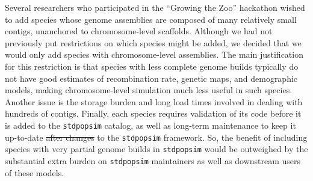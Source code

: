 \documentclass[hidelinks]{article}
\newcommand{\stdpopsim}{\texttt{stdpopsim}\xspace}
\providecommand{\DIFaddtex}[1]{{\protect\color{blue}\uwave{#1}}} %
\providecommand{\DIFdeltex}[1]{{\protect\color{red}\sout{#1}}}                      %
\providecommand{\DIFaddbegin}{} %
\providecommand{\DIFaddend}{} %
\providecommand{\DIFdelbegin}{} %
\providecommand{\DIFdelend}{} %
\providecommand{\DIFadd}[1]{\texorpdfstring{\DIFaddtex{#1}}{#1}} %
\providecommand{\DIFdel}[1]{\texorpdfstring{\DIFdeltex{#1}}{}} %
\newcommand{\DIFscaledelfig}{0.5}
\newlength{\DIFdelgraphicswidth} %
\newlength{\DIFdelgraphicsheight} %
\newcommand{\DIFaddincludegraphics}[2][]{{\color{blue}\fbox{\DIFOincludegraphics[#1]{#2}}}} %
\newcommand{\DIFdelincludegraphics}[2][]{%
\sbox{\DIFdelgraphicsbox}{\DIFOincludegraphics[#1]{#2}}%
\settoboxwidth{\DIFdelgraphicswidth}{\DIFdelgraphicsbox} %
\settoboxtotalheight{\DIFdelgraphicsheight}{\DIFdelgraphicsbox} %
\scalebox{\DIFscaledelfig}{%
\parbox[b]{\DIFdelgraphicswidth}{\usebox{\DIFdelgraphicsbox}\\[-\baselineskip] \rule{\DIFdelgraphicswidth}{0em}}\llap{\resizebox{\DIFdelgraphicswidth}{\DIFdelgraphicsheight}{%
\setlength{\unitlength}{\DIFdelgraphicswidth}%
\begin{picture}(1,1)%
\thicklines\linethickness{2pt} %
{\color[rgb]{1,0,0}\put(0,0){\framebox(1,1){}}}%
{\color[rgb]{1,0,0}\put(0,0){\line( 1,1){1}}}%
{\color[rgb]{1,0,0}\put(0,1){\line(1,-1){1}}}%
\end{picture}%
}\hspace*{3pt}}} %
} %
\DeclareRobustCommand{\DIFaddbegin}{\DIFOaddbegin \let\includegraphics\DIFaddincludegraphics} %
\DeclareRobustCommand{\DIFaddend}{\DIFOaddend \let\includegraphics\DIFOincludegraphics} %
\DeclareRobustCommand{\DIFdelbegin}{\DIFOdelbegin \let\includegraphics\DIFdelincludegraphics} %
\DeclareRobustCommand{\DIFdelend}{\DIFOaddend \let\includegraphics\DIFOincludegraphics} %
\begin{document}
Several researchers who participated in the ``Growing the Zoo'' hackathon wished to add species
whose genome assemblies are composed of many relatively small contigs,
unanchored to chromosome-level scaffolds.
Although we had not previously put restrictions on which species might be added,
we decided that we would only add species with chromosome-level assemblies.
%
The main justification for this restriction is that
species with less complete genome builds typically do not have good estimates of recombination rate, genetic maps, and demographic models,
making chromosome-level simulation much less useful in such species.
%
Another issue is the storage burden and long load times involved in dealing with
hundreds of contigs.
%
Finally, each species requires validation of its code before it is added to the \stdpopsim catalog,
as well as long-term maintenance to keep it up-to-date \DIFdelbegin \DIFdel{after changes }\DIFdelend \DIFaddbegin \DIFadd{with changes made }\DIFaddend to the \stdpopsim framework.
So, the benefit of including species with very partial genome builds in \stdpopsim
would be outweighed by the substantial extra burden on \stdpopsim maintainers as well as
downstream users of these models.
\end{document}
